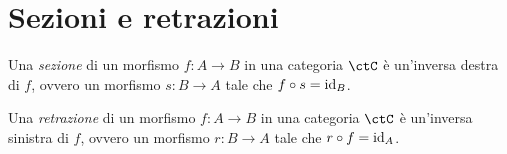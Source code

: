 \section{Sezioni e retrazioni}

\begin{definition}[Sezione]
	Una \emph{sezione} di un morfismo \(f \colon A \to B\) in una categoria \(\ctC\) è un'inversa destra di \(f\), ovvero un morfismo \(s \colon B \to A\) tale che \(f \circ s = \mathrm{id}_{B}\).
\end{definition}

\begin{definition}[Retrazione]
	Una \emph{retrazione} di un morfismo \(f \colon A \to B\) in una categoria \(\ctC\) è un'inversa sinistra di \(f\), ovvero un morfismo \(r \colon B \to A\) tale che \(r \circ f = \mathrm{id}_{A}\).
\end{definition}